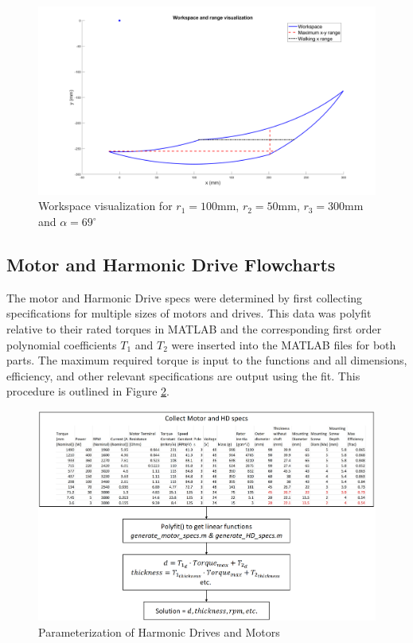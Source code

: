 \begin{figure}[H]
    \centering
    \includegraphics[width=\textwidth]{3_Parametrization/img/Workspace.png}
    \caption{Workspace visualization for $r_1=100\text{mm}$, $r_2=50\text{mm}$, $r_3=300\text{mm}$ and $\alpha=69^{\circ}$}
    \label{fig:workspace}
\end{figure}{}


\subsection{Motor and Harmonic Drive Flowcharts} \label{app_sub:HD_motor}

The motor and Harmonic Drive specs were determined by first collecting specifications for multiple sizes of motors and drives.
This data was polyfit relative to their rated torques in MATLAB and the corresponding first order polynomial coefficients $T_1$ and $T_2$ were inserted into the MATLAB files for both parts. The maximum required torque is input to the functions and all dimensions, efficiency, and other relevant specifications are output using the fit.
This procedure is outlined in Figure \ref{fig:parametrization_HD_motor}.

\begin{figure}[H]
    \centering
    \includegraphics[width=\textwidth]{6_Appendices/Flowcharts/MotorAndHDFlowchart.png}
    \caption{Parameterization of Harmonic Drives and Motors}
    \label{fig:parametrization_HD_motor}
\end{figure}{}

